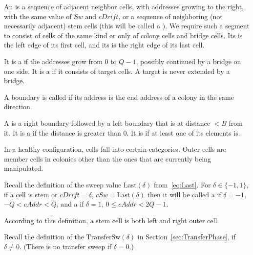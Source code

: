 \documentclass[12pt]{memoir}
\renewcommand{\le}{\leq}
\newcommand{\fld}[1]{\ensuremath{\textit{#1}}}
\def\B{B}
\newcommand{\cAddr}{\fld{cAddr}}
\newcommand{\cDrift}{\fld{cDrift}}
\newcommand{\Sweep}{\fld{Sw}}
\newcommand{\cSweep}{\fld{cSw}}
\newcommand{\Last}{\mathrm{Last}}
\newcommand{\TransferSw}{\mathrm{TransferSw}}
\begin{document}
\begin{definition}[Segments]\label{def:segments}
    An  is a sequence of adjacent neighbor 
cells, with addresses growing to the right, with the same value of \( \Sweep \)
and \( \cDrift \), or a sequence of neighboring (not necessarily adjacent) 
stem cells (this will be called a ).
We require such a segment to consist of cells of the same kind or only of 
colony cells and bridge cells.
Its  is the left edge of its first cell, and its  is 
the right edge of its last cell.

It is a  if the addresses grow from \( 0 \) to \( Q-1 \), possibly continued
by a bridge on one side.
It is a  if it consists of target cells.
A target is never extended by a bridge.

A boundary is called  if its address is the end 
address of a colony in the same direction.

A  
is a right boundary followed by a left boundary that is at distance \( <\B \) from it.
It is a  if the distance is greater than 0.
It is  if at least one of its elements is.
\end{definition}

In a healthy configuration, cells fall into certain categories.
Outer cells are member cells in colonies other than the ones that 
are currently being manipulated.

\begin{definition}\label{def:outer-cells}
    Recall the definition of the sweep value
    \(  \Last(\delta)  \) from~\eqref{eq:Last}.
    For \( \delta \in \{ -1,1 \} \), if a cell is stem or
\( \cDrift = \delta \),  \( \cSweep = \Last(\delta) \)
    then it will be called a  if
    \( \delta = -1 \), \( -Q< \cAddr < Q \),  and a  
    if \( \delta = 1 \), \( 0\le\cAddr<2Q-1 \).
\end{definition}

According to this definition, a stem cell is both left and right outer cell.

Recall the definition of the 
\( \TransferSw(\delta) \) in Section~\ref{sec:TransferPhase}, if \( \delta \ne 0 \).
(There is no transfer sweep if \( \delta = 0 \).)
\end{document}
